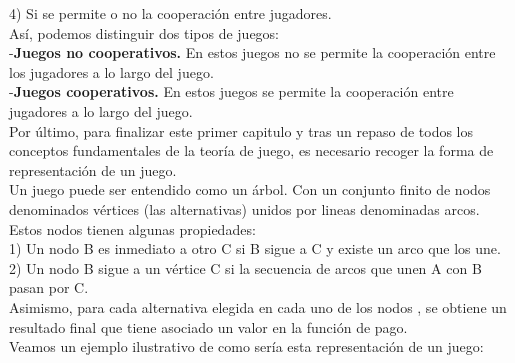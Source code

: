 \documentclass[10pt,a4paper]{book}
\begin{document}
4) Si se permite o no la cooperación entre jugadores.\\
Así, podemos distinguir dos tipos de juegos:\\
	-\textbf{Juegos no cooperativos.} En estos juegos no se permite la cooperación entre los jugadores a lo largo del juego.\\
	-\textbf{Juegos cooperativos.} En estos juegos se permite la cooperación entre jugadores a lo largo del juego.\\
	

Por último, para finalizar este primer capitulo y tras un repaso de todos los conceptos fundamentales de la teoría de juego, es necesario recoger la forma de representación de un juego.\\	
	
	
Un juego puede ser entendido como un árbol. Con un conjunto finito de nodos denominados vértices (las alternativas) unidos por lineas denominadas arcos.  \\
Estos nodos tienen algunas propiedades:\\
1) Un nodo B es inmediato a otro C si B sigue a C y existe un arco que los une.\\
2) Un nodo B sigue a un vértice C si la secuencia de arcos que unen A con B pasan por C.\\
Asimismo, para cada alternativa elegida en cada uno de los nodos , se obtiene un resultado final que tiene asociado un valor en la función de pago.\\	

Veamos un ejemplo ilustrativo de como sería esta representación de un juego: \\
\end{document}
